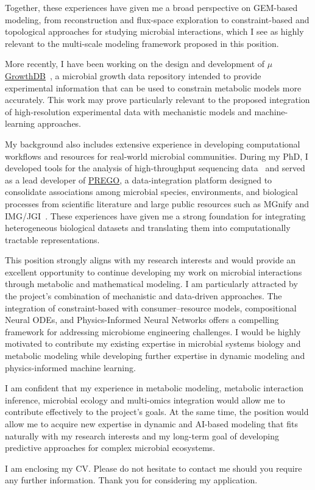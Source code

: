 Together, these experiences have given me a broad perspective on GEM-based modeling, from reconstruction and flux-space exploration to constraint-based and topological approaches for studying microbial interactions, which I see as highly relevant to the multi-scale modeling framework proposed in this position.

More recently, I have been working on the design and development of \href{https://mgrowthdb.gbiomed.kuleuven.be/}{$\mu$GrowthDB}~\cite{mgrowthdb_bibrxiv}, a microbial growth data repository intended to provide experimental information that can be used to constrain metabolic models more accurately. 
This work may prove particularly relevant to the proposed integration of high-resolution experimental data with mechanistic models and machine-learning approaches.

My background also includes extensive experience in developing computational workflows and resources for real-world microbial communities. 
During my PhD, I developed tools for the analysis of high-throughput sequencing data~\cite{zafeiropoulos2020pema,zafeiropoulos2021darn,zafeiropoulos2023metagoflow} and served as a lead developer of \href{https://prego.hcmr.gr/}{PREGO}, a data-integration platform designed to consolidate associations among microbial species, environments, and biological processes from scientific literature and large public resources such as MGnify and IMG/JGI~\cite{prego}. 
These experiences have given me a strong foundation for integrating heterogeneous biological datasets and translating them into computationally tractable representations.

This position strongly aligns with my research interests and would provide an excellent opportunity to continue developing my work on microbial interactions through metabolic and mathematical modeling. 
I am particularly attracted by the project's combination of mechanistic and data-driven approaches. 
The integration of constraint-based with consumer–resource models, compositional Neural ODEs, and Physics-Informed Neural Networks offers a compelling framework for addressing microbiome engineering challenges.
I would be highly motivated to contribute my existing expertise in microbial systems biology and metabolic modeling while developing further expertise in dynamic modeling and physics-informed machine learning.

I am confident that my experience in metabolic modeling, metabolic interaction inference, microbial ecology and multi-omics integration would allow me to contribute effectively to the project's goals. 
At the same time, the position would allow me to acquire new expertise in dynamic and AI-based modeling that fits naturally with my research interests and my long-term goal of developing predictive approaches for complex microbial ecosystems.

I am enclosing my CV. 
Please do not hesitate to contact me should you require any further information.
Thank you for considering my application. 

